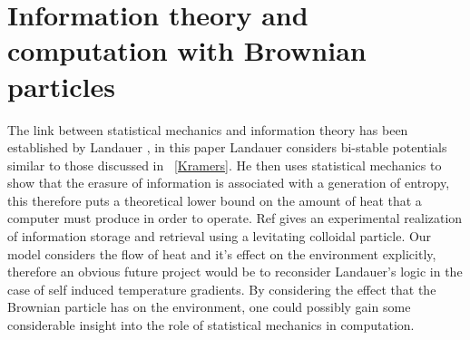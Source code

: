 \section{Information theory and computation with Brownian particles}
The link between statistical mechanics and information theory has been established by Landauer \cite{Landauer1961}, in this paper Landauer considers bi-stable potentials similar to those discussed in ~\autoref{Kramers}. He then uses statistical mechanics to show that the erasure of information is associated with a generation of entropy, this therefore puts a theoretical lower bound on the amount of heat that a computer must produce in order to operate. Ref \cite{MyersCelebranoKrishnan2015} gives an experimental realization of information storage and retrieval using a levitating colloidal particle. Our model considers the flow of heat and it's effect on the environment explicitly, therefore an obvious future project would be to reconsider Landauer's logic in the case of self induced temperature gradients. By considering the effect that the Brownian particle has on the environment, one could possibly gain some considerable insight into the role of statistical mechanics in computation.
